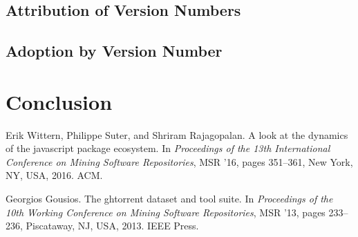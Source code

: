 \documentclass[10pt,conference]{IEEEtran}
\begin{document}
\subsection{Attribution of Version Numbers}

\subsection{Adoption by Version Number}

\section{Conclusion}


\begin{thebibliography}{00}
  Erik Wittern, Philippe Suter, and Shriram Rajagopalan.
  \newblock A look at the dynamics of the javascript package ecosystem.
  \newblock In {\em Proceedings of the 13th International Conference on Mining
    Software Repositories}, MSR '16, pages 351--361, New York, NY, USA, 2016.
    ACM.

  Georgios Gousios.
  \newblock The ghtorrent dataset and tool suite.
  \newblock In {\em Proceedings of the 10th Working Conference on Mining Software
    Repositories}, MSR '13, pages 233--236, Piscataway, NJ, USA, 2013. IEEE
    Press.

\end{thebibliography}
\vspace{12pt}
\end{document}
